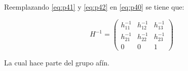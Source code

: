 \begin{enumerate}
Reemplazando \ref{eq:p41} y \ref{eq:p42} en \ref{eq:p40} se tiene que:

\begin{equation}
H^{-1} = 
\begin{pmatrix}
h^{-1}_{11} & h^{-1}_{12} & h^{-1}_{13} \\
h^{-1}_{21} & h^{-1}_{22} & h^{-1}_{23} \\
0 & 0 & 1
\end{pmatrix}
\label{eq:p43}
\end{equation} 

La cual hace parte del grupo afín.

\end{enumerate} 

